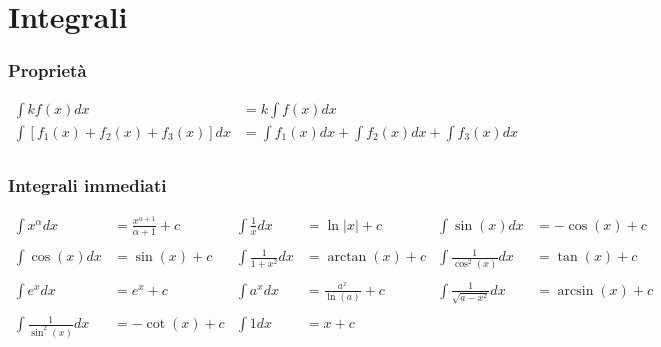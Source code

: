 \documentclass[a4paper]{article}
\begin{document}
	
	\newpage
	\section{Integrali}
	\subsubsection*{Proprietà}
	\begin{align*}
		\int k f(x) dx &= k \int f(x) dx\\
		\int \left[f_1(x)+f_2(x)+f_3(x)\right]dx &= \int f_1(x)dx + \int f_2(x)dx + \int f_3(x)dx\\
	\end{align*}
	
	\subsubsection*{Integrali immediati}
	\begin{align*}
		\int x^\alpha dx            & = \frac{x^{\alpha + 1}}{\alpha + 1} +c & \int \frac{1}{x}dx     & = \ln|x| + c              & \int \sin (x) dx              & = -\cos(x) + c    \\
		                            &                                        &  \\
		\int \cos (x) dx            & = \sin (x) +c                          & \int \frac{1}{1+x^2}dx & = \arctan (x) +c          & \int \frac{1}{\cos^2 (x)}dx   & = \tan (x) + c    \\
		                            &                                        &  \\
		\int e^x dx                 & = e^x +c                               & \int a^x dx            & = \frac{a^x}{\ln (a)} + c & \int \frac{1}{\sqrt{a-x^2}}dx & = \arcsin (x) + c \\
		                            &  \\
		\int \frac{1}{\sin^2 (x)}dx & = -\cot(x) + c                         & \int 1 dx              & = x+c                     &\\
	\end{align*}
	
\end{document}
